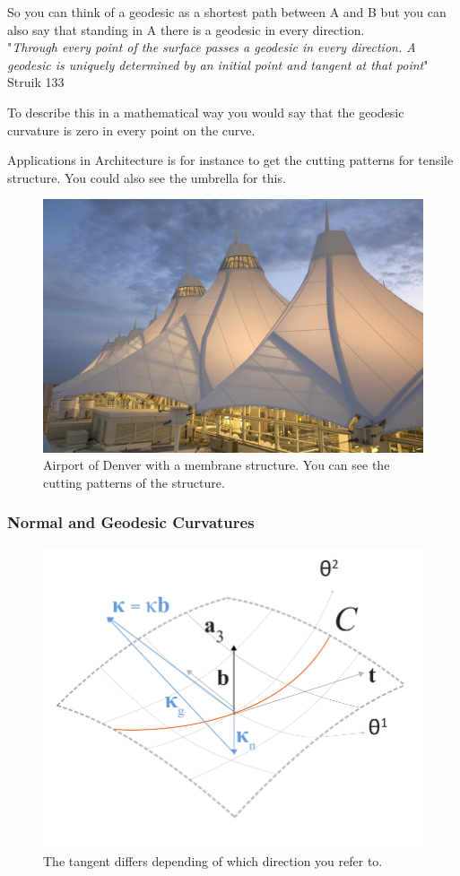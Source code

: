 So you can think of a geodesic as a shortest path between A and B but you can also say that standing in A there is a geodesic in every direction.\\

"\textit{Through every point of the surface passes a geodesic in every direction. A geodesic is uniquely determined by an initial point and tangent at that point}" Struik 133

To describe this in a mathematical way you would say that the geodesic curvature is zero in every point on the curve. 

Applications in Architecture is for instance to get the cutting patterns for tensile structure. You could also see the umbrella for this.


\begin{figure}[H]
\centering
\includegraphics[width=0.9\linewidth ]{figure/Theory/Denver.jpg}

\caption{Airport of Denver with a membrane structure. You can see the cutting patterns of the structure. }
\end{figure}

\subsubsection{Normal and Geodesic Curvatures}

\begin{figure}[H]
\centering
\includegraphics[height=0.6\linewidth ]{figure/Theory/SFF.pdf}
\caption{The tangent differs depending of which direction you refer to. }
\end{figure}



